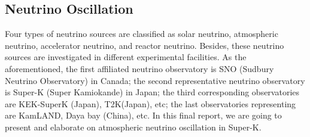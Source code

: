 \documentclass[12pt]{article}
\begin{document}
\setlength{\columnsep}{0.03\textwidth}
\begin{multicols}{2}
    
\section{Neutrino Oscillation}
    Four types of neutrino sources are classified as solar neutrino, atmospheric neutrino, accelerator neutrino, and reactor neutrino. Besides, these neutrino sources are investigated in different experimental facilities. As the aforementioned, the first affiliated neutrino observatory is SNO (Sudbury Neutrino Observatory) in Canada; the second representative neutrino observatory is Super-K (Super Kamiokande) in Japan; the third corresponding observatories are KEK-SuperK (Japan), T2K(Japan), etc; the last observatories representing are KamLAND, Daya bay (China), etc. In this final report, we are going to present and elaborate on atmospheric neutrino oscillation in Super-K.


\end{multicols}
\end{document}
